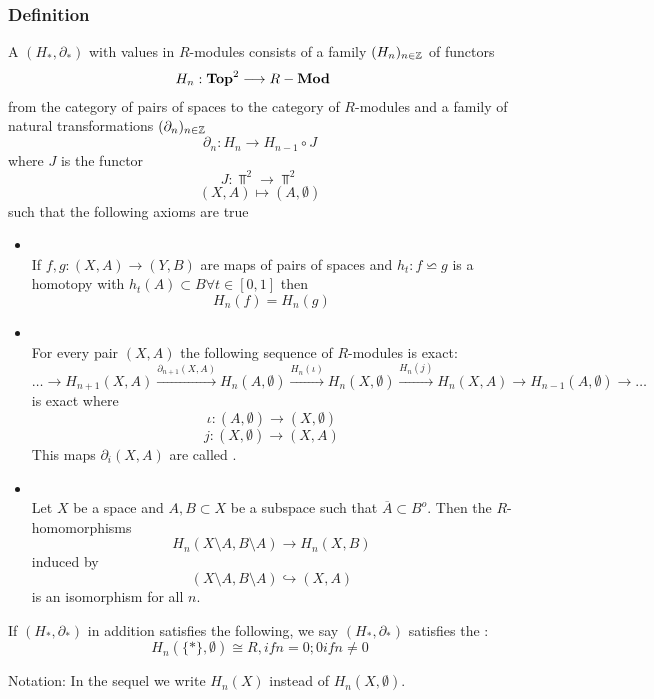 \subsubsection{Definition}
A  $(H_*, \partial_*)$ with values in $R$-modules consists of a family $(H_n)_{n\in\mathbb{Z}}$ of functors
\begin{align*}
H_n : \textbf{Top}^2 & \longrightarrow R-\textbf{Mod}
\end{align*}
from the category of pairs of spaces to the category of $R$-modules and a family of natural transformations $(\partial_n)_{n\in \mathbb{Z}}$
\[\partial_n : H_n \longrightarrow H_{n-1} \circ J \]
where $J$ is the functor 
\[J : \Top^2 \longrightarrow \Top^2\]
\[(X,A) \longmapsto (A,\emptyset)\]
such that the following axioms are true
\begin{itemize}
\item {}\\
If $f,g : (X,A) \rightarrow (Y,B)$ are maps of pairs of spaces and $h_t : f \backsimeq g$ is a homotopy with $h_t(A) \subset B \forall t \in [0,1]$ then
\[H_n(f) = H_n(g)\]
\item {}\\
For every  pair $(X,A)$ the following sequence of $R$-modules is exact:
\[ \ldots\longrightarrow H_{n+1}(X,A)\overset{\partial_{n+1}(X,A)}{\longrightarrow }H_n(A,\emptyset)\overset{H_n(\iota)}{ \longrightarrow} H_n(X,\emptyset) \overset{H_n(j)}{ \longrightarrow}H_n(X,A) \longrightarrow H_{n-1}(A,\emptyset) \longrightarrow \ldots \]
is exact where
\[\iota : (A,\emptyset) \longrightarrow (X,\emptyset) \]
\[j : (X,\emptyset) \longrightarrow (X,A)\]
This maps $\partial_i(X,A)$ are called .

\item {}\\
Let $X$ be a space and $A,B\subset X$ be a subspace such that $\overline{A} \subset B^o$. Then the $R$-homomorphisms
\[H_n(X\setminus A, B\setminus A) \longrightarrow H_n(X,B)\]
induced by
\[(X\setminus A, B\setminus A) \hookrightarrow (X,A)\]
is an isomorphism for all $n$.

\end{itemize}
If $(H_*, \partial_*)$ in addition satisfies the following, we say  $(H_*, \partial_*)$ satisfies the :
\[H_n(\{*\}, \emptyset) \cong R, if n = 0; 0 if n \neq 0\]

Notation: In the sequel we write $H_n(X)$ instead of $H_n(X,\emptyset)$.

